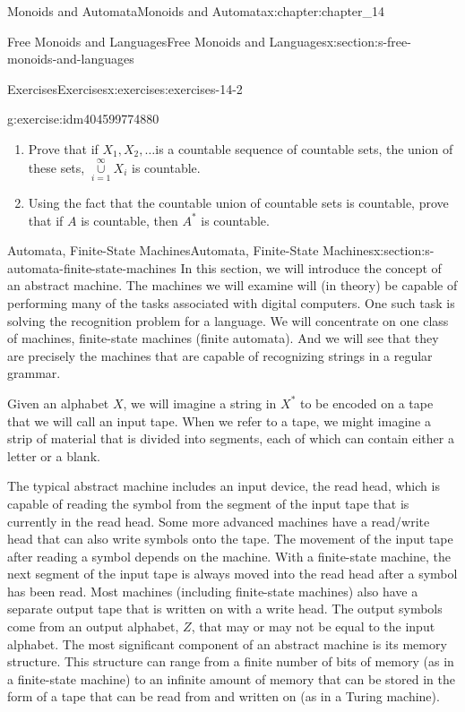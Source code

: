 \documentclass[twoside,10pt,]{book}
\numberwithin{equation}{section}
\begin{document}
\begin{chapterptx}{Monoids and Automata}{}{Monoids and Automata}{}{}{x:chapter:chapter_14}
\begin{sectionptx}{Free Monoids and Languages}{}{Free Monoids and Languages}{}{}{x:section:s-free-monoids-and-languages}
\begin{exercises-subsection}{Exercises}{}{Exercises}{}{}{x:exercises:exercises-14-2}
\begin{divisionexercise}{9}{}{}{g:exercise:idm404599774880}
%
\begin{enumerate}[label=(\alph*)]
\item{}Prove that if \(X_1, X_2, \ldots\)is a countable sequence of countable sets, the union of these sets, \(\underset{i=1}{\overset{\infty }{\cup}}X_i\) is countable.%
\item{}Using the fact that the countable union of countable sets is countable, prove that if \(A\) is countable, then \(A^*\) is countable.%
\end{enumerate}
%
\end{divisionexercise}%
\end{exercises-subsection}
\end{sectionptx}
%
%
\typeout{************************************************}
\typeout{************************************************}
%
\begin{sectionptx}{Automata, Finite-State Machines}{}{Automata, Finite-State Machines}{}{}{x:section:s-automata-finite-state-machines}
%
%
In this section, we will introduce the concept of an abstract machine. The machines we will examine will (in theory) be capable of performing many of the tasks associated with digital computers. One such task is solving the recognition problem for a language. We will concentrate on one class of machines, finite-state machines (finite automata). And we will see that they are precisely the machines that are capable of recognizing strings in a regular grammar.%
\par
Given an alphabet \(X\), we will imagine a string in \(X^*\) to be encoded on a tape that we will call an input tape. When we refer to a tape, we might imagine a strip of material that is divided into segments, each of which can contain either a letter or a blank.%
\par
The typical abstract machine includes an input device, the read head, which is capable of reading the symbol from the segment of the input tape that is currently in the read head. Some more advanced machines have a read\slash{}write head that can also write symbols onto the tape. The movement of the input tape after reading a symbol depends on the machine. With a finite-state machine, the next segment of the input tape is always moved into the read head after a symbol has been read. Most machines (including finite-state machines) also have a separate output tape that is written on with a write head. The output symbols come from an output alphabet, \(Z\), that may or may not be equal to the input alphabet. The most significant component of an abstract machine is its memory structure. This structure can range from a finite number of bits of memory (as in a finite-state machine) to an infinite amount of memory that can be stored in the form of a tape that can be read from and written on (as in a Turing machine).%

\end{sectionptx}
\end{chapterptx}
\end{document}
